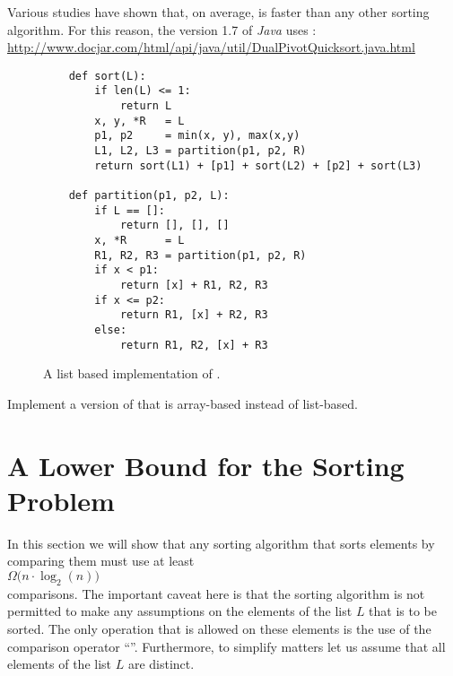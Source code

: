 \begin{enumerate}
      Various studies have shown that, on average,  is faster than any other sorting
      algorithm.  For this reason, the version 1.7 of \textsl{Java} uses :
      \\[0.2cm]
      \hspace*{0.3cm}
      \href{http://www.docjar.com/html/api/java/util/DualPivotQuicksort.java.html}{http://www.docjar.com/html/api/java/util/DualPivotQuicksort.java.html} 
\end{enumerate}

\begin{figure}[!ht]
\centering
\begin{verbatim}
    def sort(L):
        if len(L) <= 1:
            return L
        x, y, *R   = L
        p1, p2     = min(x, y), max(x,y)
        L1, L2, L3 = partition(p1, p2, R)
        return sort(L1) + [p1] + sort(L2) + [p2] + sort(L3)
    
    def partition(p1, p2, L):
        if L == []:
            return [], [], []
        x, *R      = L
        R1, R2, R3 = partition(p1, p2, R)
        if x < p1:
            return [x] + R1, R2, R3
        if x <= p2:
            return R1, [x] + R2, R3
        else:
            return R1, R2, [x] + R3
\end{verbatim}
\vspace*{-0.3cm}
\caption{A list based implementation of .}
\label{fig:dual-pivot-quick-sort.stlx}
\end{figure}

\exercise
Implement a version of  that is array-based instead of list-based.
\eoxs


\section{A Lower Bound for the Sorting Problem}
In this section we will show that any sorting algorithm that sorts elements by comparing them must
use at least 
\\[0.2cm]
\hspace*{1.3cm}
 $\Omega\bigl(n \cdot \log_2(n)\bigr)$ 
\\[0.2cm]
comparisons.  The important caveat here is that the sorting algorithm is not permitted to make any assumptions
on the elements of the list $L$ that is to be sorted.  The only operation that is allowed on these
elements is the use of the comparison operator ``\mytt{<}''.  Furthermore, to simplify matters let
us assume that all elements of the list $L$ are distinct.

